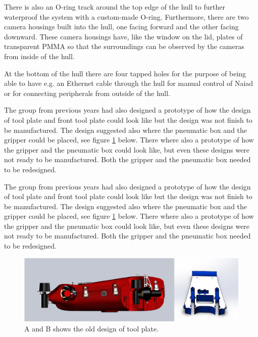 There is also an O-ring track around the top edge of the hull to further waterproof the system with a custom-made O-ring. Furthermore, there are two camera housings built into the hull, one facing forward and the other facing downward. These camera housings have, like the window on the lid, plates of transparent PMMA so that the surroundings can be observed by the cameras from inside of the hull.

At the bottom of the hull there are four tapped holes for the purpose of being able to have e.g. an Ethernet cable through the hull for manual control of Naiad or for connecting peripherals from outside of the hull. 

The group from previous years had also designed a prototype of how the design of tool plate and front tool plate could look like but the design was not finish to be manufactured. The design suggested also where the pneumatic box and the gripper could be placed, see figure \ref{Toolplate} below. There where also a prototype of how the gripper and the pneumatic box could look like, but even these designs were not ready to be manufactured. Both the gripper and the pneumatic box needed to be redesigned.

The group from previous years had also designed a prototype of how the design of tool plate and front tool plate could look like but the design was not finish to be manufactured. The design suggested also where the pneumatic box and the gripper could be placed, see figure \ref{Toolplate} below. There where also a prototype of how the gripper and the pneumatic box could look like, but even these designs were not ready to be manufactured. Both the gripper and the pneumatic box needed to be redesigned.

	\begin{figure}[!ht]
	\begin{center}
		\includegraphics[width=150mm]{./images/mechanics/Naiadassembly.JPG}
		\caption{A and B shows the old design of tool plate.}
		\label{Toolplate}
	\end{center}
\end{figure}
		
